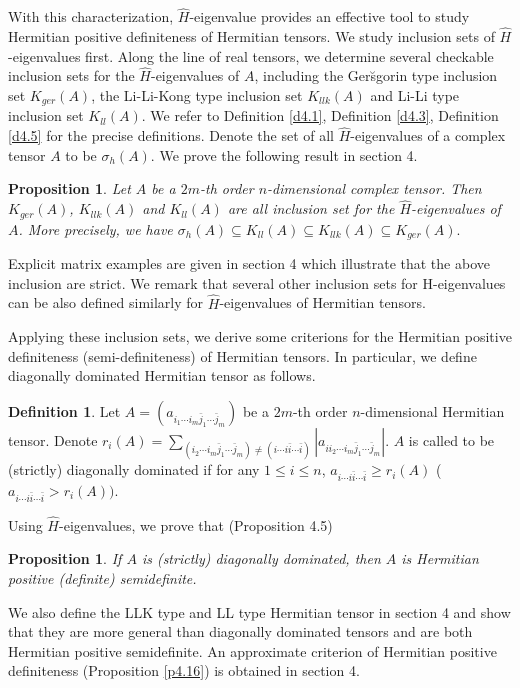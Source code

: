 \documentclass[10pt,reqno]{amsart}
\newtheorem{prop}[thm]{Proposition}
\theoremstyle{definition}
\newtheorem{defn}[thm]{Definition}
\begin{document}
 With this characterization, $\hat{H}$-eigenvalue provides an effective tool to study Hermitian positive definiteness of Hermitian tensors. We study inclusion sets of $\hat{H}$-eigenvalues first. Along the line of real tensors, we determine several checkable inclusion sets for the $\hat{H}$-eigenvalues of $A$, including the Ger\u{s}gorin type inclusion set $K_{ger}(A)$, the Li-Li-Kong type inclusion set $K_{llk}(A)$ and Li-Li type inclusion set $K_{ll}(A)$. We refer to Definition \ref{d4.1}, Definition \ref{d4.3}, Definition \ref{d4.5} for the precise definitions.
Denote the set of all $\hat{H}$-eigenvalues of a complex tensor $A$ to be $\sigma_h(A)$. We prove the following result in section 4.
\begin{prop} Let $A$ be a $2m$-th order $n$-dimensional complex tensor. Then $K_{ger}(A)$, $K_{llk}(A)$ and $K_{ll}(A)$ are all inclusion set for the  $\hat{H}$-eigenvalues of $A$. More precisely, we have 
	$\sigma_h(A)\subseteq K_{ll}(A)\subseteq K_{llk}(A)\subseteq K_{ger}(A).$ 
\end{prop}
Explicit matrix examples are given in section 4 which illustrate that the above inclusion are strict. We remark that several other inclusion sets for H-eigenvalues can be also defined similarly for $\hat{H}$-eigenvalues of Hermitian tensors. 

Applying these inclusion sets, we derive some criterions for the Hermitian positive definiteness (semi-definiteness) of Hermitian tensors. In particular, we define diagonally dominated Hermitian tensor as follows.
\begin{defn}
	Let $A=(a_{i_1\cdots i_m\bar{j}_1\cdots \bar{j}_m})$ be a $2m$-th order $n$-dimensional Hermitian tensor. Denote $r_i(A)=\sum_{(i_2\cdots i_m\bar{j}_1\cdots \bar{j}_{m})\neq (i\cdots i\bar{i}\cdots\bar{i})}|a_{ii_2\cdots i_{m}\bar{j}_1\cdots \bar{j}_m}|$. $A$ is called to be (strictly) diagonally dominated if for any $1\leq i\leq n$, $a_{i\cdots i \bar{i}\cdots \bar{i}}\geq r_i(A)$ ($a_{i\cdots i \bar{i}\cdots \bar{i}}> r_i(A))$. \end{defn}
Using $\hat{H}$-eigenvalues, we prove that (Proposition 4.5) 
	\begin{prop} \label{p1.7}
	If $A$ is (strictly) diagonally dominated, then $A$ is Hermitian positive (definite) semidefinite.
	\end{prop}
 We also define the LLK type and LL type Hermitian tensor in section 4 and show that they are more general than diagonally dominated tensors and are both Hermitian positive semidefinite. An approximate criterion of Hermitian positive definiteness (Proposition \ref{p4.16}) is obtained in section 4.
\end{document}
